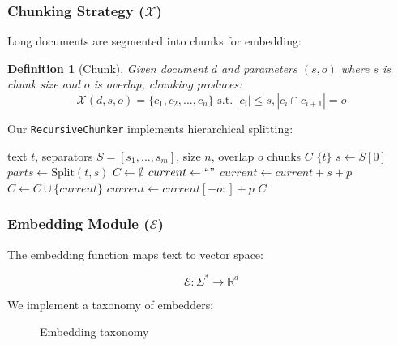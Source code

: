 \documentclass[11pt,a4paper]{article}
\newtheorem{definition}{Definition}
\newcommand{\vecspace}{\mathbb{R}^d}
\begin{document}
\subsubsection{Chunking Strategy ($\mathcal{X}$)}

Long documents are segmented into chunks for embedding:

\begin{definition}[Chunk]
Given document $d$ and parameters $(s, o)$ where $s$ is chunk size and $o$ is overlap, chunking produces:
\begin{equation}
\mathcal{X}(d, s, o) = \{c_1, c_2, ..., c_n\} \text{ s.t. } |c_i| \leq s, |c_i \cap c_{i+1}| = o
\end{equation}
\end{definition}

Our \texttt{RecursiveChunker} implements hierarchical splitting:

\begin{algorithm}
\caption{Recursive Text Chunking}
\begin{algorithmic}[1]
\Require text $t$, separators $S = [s_1, ..., s_m]$, size $n$, overlap $o$
\Ensure chunks $C$
        \State \Return $\{t\}$
    \EndIf
    \State $s \gets S[0]$ 
    \State $parts \gets \text{Split}(t, s)$
    \State $C \gets \emptyset$
    \State $current \gets ``"$
            \State $current \gets current + s + p$
        \Else
            \State $C \gets C \cup \{current\}$
            \State $current \gets current[-o:] + p$
        \EndIf
    \EndFor
    \State \Return $C$
\EndFunction
\end{algorithmic}
\end{algorithm}

\subsubsection{Embedding Module ($\mathcal{E}$)}

The embedding function maps text to vector space:

\begin{equation}
\mathcal{E}: \Sigma^* \rightarrow \vecspace
\end{equation}

We implement a taxonomy of embedders:

\begin{figure}[h]
\centering
{}
\caption{Embedding taxonomy}
\label{fig:embed_taxonomy}
\end{figure}
\end{document}
